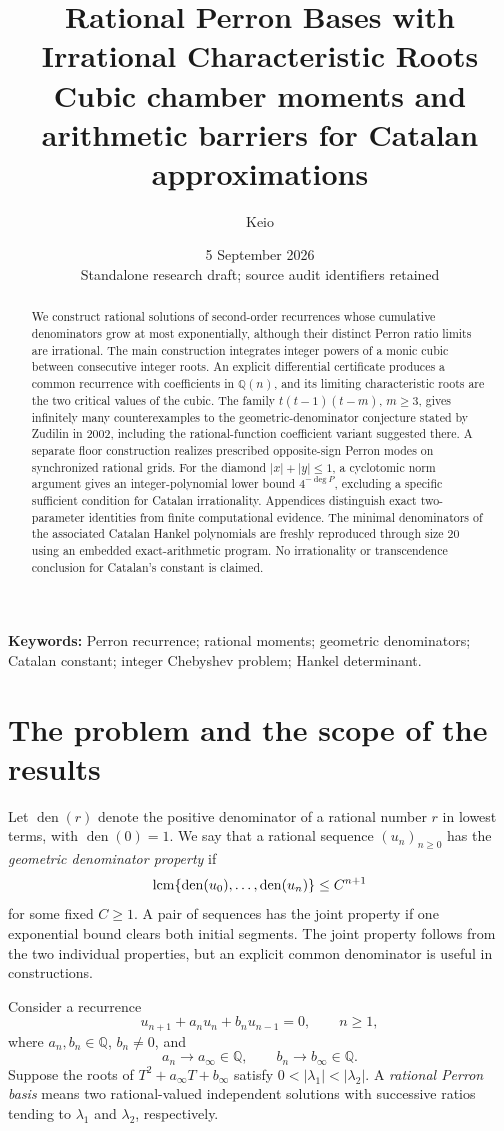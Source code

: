 \documentclass[11pt,a4paper]{article}
\author{Keio}
\date{5 September 2026\\\small Standalone research draft; source audit identifiers retained}
\title{Rational Perron Bases with Irrational Characteristic Roots\\\large Cubic chamber moments and arithmetic barriers for Catalan approximations}
\theoremstyle{definition}\newtheorem{definition}[theorem]{Definition}
\theoremstyle{remark}\newtheorem{remark}[theorem]{Remark}
\newcommand{\Q}{\mathbb Q}\newcommand{\Z}{\mathbb Z}\newcommand{\N}{\mathbb N}\newcommand{\R}{\mathbb R}\newcommand{\C}{\mathbb C}
\begin{document}
\maketitle
\begin{abstract}
We construct rational solutions of second-order recurrences whose cumulative denominators grow at most exponentially, although their distinct Perron ratio limits are irrational. The main construction integrates integer powers of a monic cubic between consecutive integer roots. An explicit differential certificate produces a common recurrence with coefficients in $\Q(n)$, and its limiting characteristic roots are the two critical values of the cubic. The family $t(t-1)(t-m)$, $m\ge3$, gives infinitely many counterexamples to the geometric-denominator conjecture stated by Zudilin in 2002, including the rational-function coefficient variant suggested there. A separate floor construction realizes prescribed opposite-sign Perron modes on synchronized rational grids. For the diamond $|x|+|y|\le1$, a cyclotomic norm argument gives an integer-polynomial lower bound $4^{-\deg P}$, excluding a specific sufficient condition for Catalan irrationality. Appendices distinguish exact two-parameter identities from finite computational evidence. The minimal denominators of the associated Catalan Hankel polynomials are freshly reproduced through size $20$ using an embedded exact-arithmetic program. No irrationality or transcendence conclusion for Catalan's constant is claimed.
\end{abstract}
\noindent\textbf{Keywords:} Perron recurrence; rational moments; geometric denominators; Catalan constant; integer Chebyshev problem; Hankel determinant.

\section{The problem and the scope of the results}
Let $\operatorname{den}(r)$ denote the positive denominator of a rational number $r$ in lowest terms, with $\operatorname{den}(0)=1$. We say that a rational sequence $(u_n)_{n\ge0}$ has the \emph{geometric denominator property} if
\[
 \operatorname{lcm}\{\operatorname{den}(u_0),\ldots,\operatorname{den}(u_n)\}\le C^{n+1}
\]
for some fixed $C\ge1$. A pair of sequences has the joint property if one exponential bound clears both initial segments. The joint property follows from the two individual properties, but an explicit common denominator is useful in constructions.

Consider a recurrence
\begin{equation}\label{eq:perron}
 u_{n+1}+a_nu_n+b_nu_{n-1}=0,\qquad n\ge1,
\end{equation}
where $a_n,b_n\in\Q$, $b_n\ne0$, and
\[
 a_n\longrightarrow a_\infty\in\Q,\qquad
 b_n\longrightarrow b_\infty\in\Q.
\]
Suppose the roots of $T^2+a_\infty T+b_\infty$ satisfy
$0<|\lambda_1|<|\lambda_2|$. A \emph{rational Perron basis} means two rational-valued independent solutions with successive ratios tending to $\lambda_1$ and $\lambda_2$, respectively.
\end{document}
